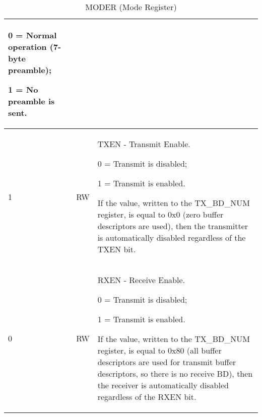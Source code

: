 \begin{table}[H]
\begin{tabularx}{\textwidth}{|l|l|X|}
                0 = Normal operation (7-byte preamble); 

                1 = No preamble is sent. \\ \hline
    1       & RW &   TXEN - Transmit Enable. 

                0 = Transmit is disabled; 

                1 = Transmit is enabled. 

                If the value, written to the TX\_BD\_NUM register, is equal to 0x0 (zero buffer descriptors are used), then the transmitter is automatically disabled regardless of the TXEN bit. \\ \hline
    \rowcolor{iob-blue}
    0       & RW &   RXEN - Receive Enable. 

                0 = Transmit is disabled; 

                1 = Transmit is enabled. 

                If the value, written to the TX\_BD\_NUM register, is equal to 0x80 (all buffer descriptors are used for transmit buffer descriptors, so there is no receive BD), then the receiver is automatically disabled regardless of the RXEN bit.
 \\ \hline
 
  \end{tabularx}
    \caption{MODER (Mode Register)}
  \label{swreg_details:moder}
\end{table}

